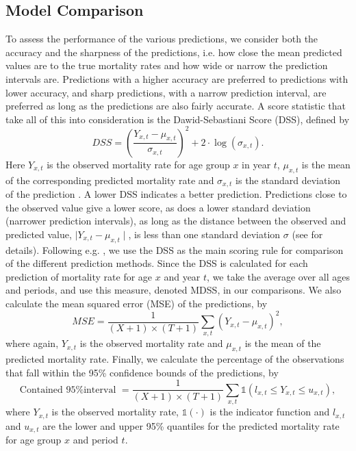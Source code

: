 \subsection{Model Comparison}
\newpar To assess the performance of the various predictions, we consider both the accuracy and the sharpness of the predictions, i.e. how close the mean predicted values are to the true mortality rates and how wide or narrow the prediction intervals are. Predictions with a higher accuracy are preferred to predictions with lower accuracy, and sharp predictions, with a narrow prediction interval, are preferred as long as the predictions are also fairly accurate. A score statistic that take all of this into consideration is the Dawid-Sebastiani Score (DSS), defined by 
\begin{equation}
    DSS = (\frac{Y_{x,t} - \mu_{x,t}}{\sigma_{x,t}})^2 + 2\cdot \log(\sigma_{x,t}).
\end{equation}
Here $Y_{x,t}$ is the observed mortality rate for age group $x$ in year $t$, $\mu_{x,t}$ is the mean of the corresponding predicted mortality rate and $\sigma_{x,t}$ is the standard deviation of the prediction \parencite{Gneiting2007}. A lower DSS indicates a better prediction. Predictions close to the observed value give a lower score, as does a lower standard deviation (narrower prediction intervals), as long as the distance between the observed and predicted value, $\mid Y_{x,t} - \mu_{x,t} \mid$, is less than one standard deviation $\sigma$ (see \textcite{Keilman2020} for details). Following e.g. \textcite{RieblerHeldRue2012}, we use the DSS as the main scoring rule for comparison of the different prediction methods. Since the DSS is calculated for each prediction of mortality rate for age $x$ and year $t$, we take the average over all ages and periods, and use this measure, denoted MDSS, in our comparisons. We also calculate the mean squared error (MSE) of the predictions, by
\begin{equation}
    MSE = \frac{1}{(X + 1)\times(T + 1)}\sum_{x,t} (Y_{x,t} - \mu_{x,t})^2,
\end{equation}
where again, $Y_{x,t}$ is the observed mortality rate and $\mu_{x,t}$ is the mean of the predicted mortality rate. Finally, we calculate the percentage of the observations that fall within the 95\% confidence bounds of the predictions, by
\begin{equation}
    \text{Contained 95\% interval }= \frac{1}{(X + 1)\times(T + 1)}\sum_{x,t}\mathbb{1}(l_{x,t} \leq Y_{x,t} \leq u_{x,t}),
\end{equation}
where $Y_{x,t}$ is the observed mortality rate, $\mathbb{1}(\cdot)$ is the indicator function and $l_{x,t}$ and $u_{x,t}$ are the lower and upper 95\% quantiles for the predicted mortality rate for age group $x$ and period $t$. 

